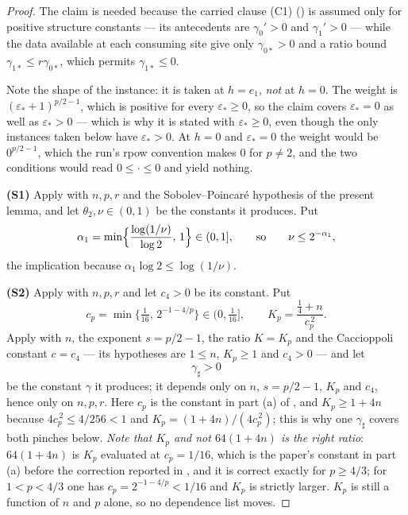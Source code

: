 \begin{proof}
The claim is needed because the carried clause (C1)
() is assumed only for positive structure
constants --- its antecedents are $\gamma_0'>0$ and $\gamma_1'>0$ --- while the
data available at each consuming site give only $\gamma_{0\ast}>0$ and a ratio
bound $\gamma_{1\ast}\le r\gamma_{0\ast}$, which permits $\gamma_{1\ast}\le0$.

Note the shape of the instance: it is taken at $h=e_1$, \emph{not} at $h=0$.  The
weight is $(\varepsilon_\ast+1)^{p/2-1}$, which is positive for every
$\varepsilon_\ast\ge0$, so the claim covers $\varepsilon_\ast=0$ as well as
$\varepsilon_\ast>0$ --- which is why it is stated with $\varepsilon_\ast\ge0$,
even though the only instances taken below have $\varepsilon_\ast>0$.  At $h=0$
and $\varepsilon_\ast=0$ the weight would be $0^{p/2-1}$, which the run's rpow
convention makes $0$ for $p\ne2$, and the two conditions would read
$0\le\cdot\le0$ and yield nothing.

\textbf{(S1)} Apply  with $n,p,r$ and the
Sobolev--Poincar\'e hypothesis  of the present
lemma, and let $\theta_2,\nu\in(0,1)$ be the constants it produces.  Put
\[
\alpha_1=\min\Bigl\{\frac{\log(1/\nu)}{\log2},\,1\Bigr\}\in(0,1],
\qquad\text{so}\qquad \nu\le2^{-\alpha_1},
\]
the implication because $\alpha_1\log2\le\log(1/\nu)$.

\textbf{(S2)} Apply  with $n,p,r$ and let
$c_4>0$ be its constant.  Put
\[
c_p=\min\{\tfrac1{16},\,2^{-1-4/p}\}\in(0,\tfrac1{16}],
\qquad
K_p=\frac{\tfrac14+n}{c_p^{\,2}} .
\]
Apply  with $n$, the exponent
$s=p/2-1$, the ratio $K=K_p$ and the Caccioppoli constant $c=c_4$ --- its
hypotheses are $1\le n$, $K_p\ge1$ and $c_4>0$ --- and let
\[
\gamma_\sharp>0
\]
be the constant $\gamma$ it produces; it depends only on $n$, $s=p/2-1$, $K_p$
and $c_4$, hence only on $n,p,r$.
Here $c_p$ is the constant in part (a) of , and
$K_p\ge1+4n$ because $4c_p^{\,2}\le4/256<1$ and
$K_p=(1+4n)/(4c_p^{\,2})$; this is why one $\gamma_\sharp$ covers both pinches
below.
\emph{Note that $K_p$ and not $64(1+4n)$ is the right ratio}: $64(1+4n)$ is
$K_p$ evaluated at $c_p=1/16$, which is the paper's constant in part (a) before
the correction reported in , and it is correct
exactly for $p\ge4/3$; for $1<p<4/3$ one has $c_p=2^{-1-4/p}<1/16$ and $K_p$ is
strictly larger.  $K_p$ is still a function of $n$ and $p$ alone, so no
dependence list moves.


\end{proof}
